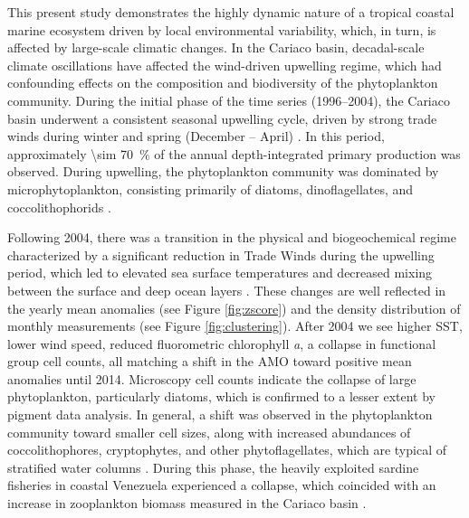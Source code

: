 \documentclass[draft]{agujournal2019}
\begin{document}
This present study demonstrates the highly dynamic nature of a tropical coastal marine ecosystem driven by local environmental variability, which, in turn, is affected by large-scale climatic changes. In the Cariaco basin, decadal-scale climate oscillations have affected the wind-driven upwelling regime, which had confounding effects on the composition and biodiversity of the phytoplankton community.
During the initial phase of the time series (1996–2004), the Cariaco basin underwent a consistent seasonal upwelling cycle, driven by strong trade winds during winter and spring (December – April) \cite{mullerkarger_annual_2001, astor_seasonal_2003}. In this period, approximately \qty{\sim 70}{\%} of the annual depth-integrated primary production was observed. During upwelling, the phytoplankton community was dominated by microphytoplankton, consisting primarily of diatoms, dinoflagellates, and coccolithophorids \cite{pinckney_phytoplankton_2015}.

Following 2004, there was a transition in the physical and biogeochemical regime characterized by a significant reduction in Trade Winds during the upwelling period, which led to elevated sea surface temperatures and decreased mixing between the surface and deep ocean layers \cite{taylor_ecosystem_2012}. These changes are well reflected in the yearly mean anomalies (see Figure \ref{fig:zscore}) and the density distribution of monthly measurements (see Figure \ref{fig:clustering}). After 2004 we see higher SST, lower wind speed, reduced fluorometric chlorophyll \textit{a}, a collapse in functional group cell counts, all matching a shift in the AMO toward positive mean anomalies until 2014. Microscopy cell counts indicate the collapse of large phytoplankton, particularly diatoms, which is confirmed to a lesser extent by pigment data analysis. In general, a shift was observed in the phytoplankton community toward smaller cell sizes, along with increased abundances of coccolithophores, cryptophytes, and other phytoflagellates, which are typical of stratified water columns \cite{pinckney_phytoplankton_2015}. During this phase, the heavily exploited sardine fisheries in coastal Venezuela experienced a collapse, which coincided with an increase in zooplankton biomass measured in the Cariaco basin \cite{taylor_ecosystem_2012}.
\end{document}
